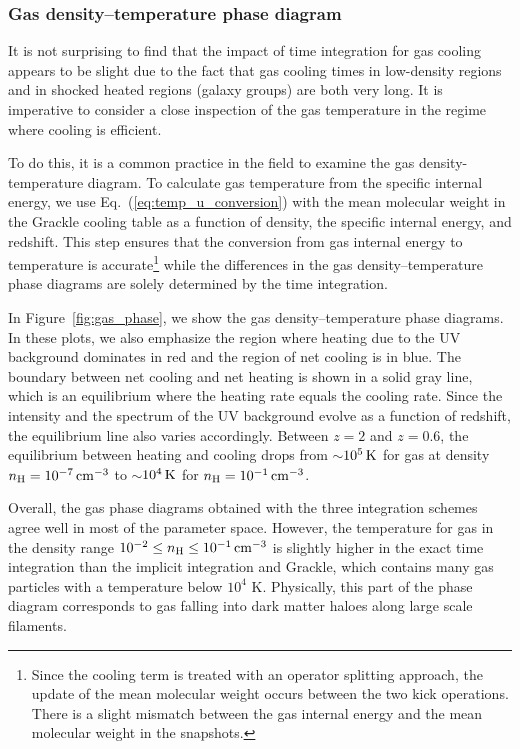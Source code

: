\documentclass[a4paper,fleqn,usenatbib,useAMS, twocolumn]{mnras}
\begin{document}
\subsubsection{Gas density--temperature phase diagram}
It is not surprising to find that the impact of time integration for gas cooling appears
to be slight due to the fact that gas cooling times in low-density regions and in 
shocked heated regions (galaxy groups) are both very long. 
It is imperative to consider a close inspection of the gas temperature 
in the regime where cooling is efficient. 

To do this, it is a common practice in the field to examine the gas density-temperature diagram. 
To calculate gas temperature from the specific internal energy, we use Eq.~(\ref{eq:temp_u_conversion}) 
with the mean molecular weight in the {\sc Grackle} cooling table as a function of density, 
the specific internal energy, and redshift. This step ensures that the conversion from gas internal energy to 
temperature is accurate\footnote{Since the cooling term is treated with an operator splitting
approach, the update of the mean molecular weight occurs between the two kick operations. 
There is a slight mismatch between the gas internal energy and the mean molecular weight 
in the snapshots.} while the differences in the gas density--temperature phase diagrams are 
solely determined by the time integration. 

In Figure~\ref{fig:gas_phase}, we show the gas density--temperature phase diagrams. In these 
plots, we also emphasize the region where heating due to the UV background dominates 
in red and the region of net cooling is in blue. The boundary between net cooling and 
net heating is shown in a solid gray line, which is an equilibrium where the heating rate 
equals the cooling rate. Since the intensity and the spectrum of the UV background evolve
as a function of redshift, the equilibrium line also varies accordingly. Between $z = 2$ and 
$z = 0.6$, the equilibrium between heating and cooling drops from $\sim$$10^5\, \rm{K}$ for gas
at density
$n_{\rm H} = 10^{-7}\, \rm{cm^{-3}}$ to $\sim$$10^4\, \rm{K}$ for $n_{\rm H} = 10^{-1}\, \rm{cm^{-3}}$. 

Overall, the gas phase diagrams obtained with the three integration schemes agree well
in most of the parameter space. 
However, the temperature for gas in the density range
$10^{-2} \le n_{\rm H} \le 10^{-1}\, \rm{cm^{-3}}$ is slightly higher in the exact time integration 
than the implicit integration and {\sc Grackle}, which contains many gas particles with a temperature 
below $10^4$ K. Physically, this part of the phase diagram corresponds to gas falling into 
dark matter haloes along large scale filaments. 
\end{document}
